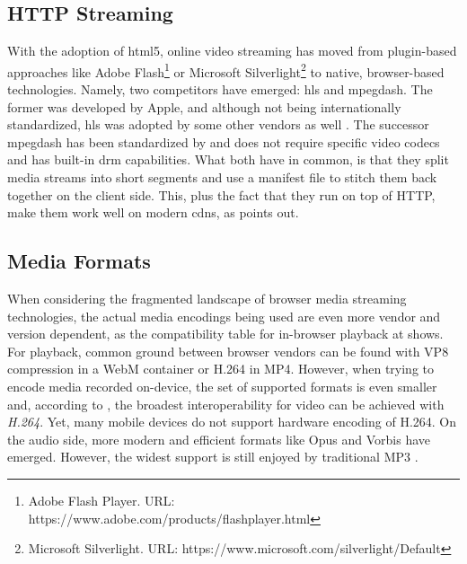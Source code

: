 \subsection{HTTP Streaming}\label{sec:http-streaming}

With the adoption of \gls{html}5, online video streaming has moved from plugin-based approaches like Adobe Flash\footnote{\label{adobe-flash}Adobe Flash Player. URL: {https://www.adobe.com/products/flashplayer.html}} or Microsoft Silverlight\footnote{\label{silverlight}Microsoft Silverlight. URL: {https://www.microsoft.com/silverlight/Default}} to native, browser-based technologies. Namely, two competitors have emerged: \gls{hls} and \gls{mpegdash}. The former was developed by Apple, and although not being internationally standardized, \gls{hls} was adopted by some other vendors as well \cite{caniuse-hls}. The successor \gls{mpegdash} has been standardized by \citet{iso-mpeg-dash} and does not require specific video codecs and has built-in \gls{drm} capabilities. What both have in common, is that they split media streams into short segments and use a manifest file to stitch them back together on the client side. This, plus the fact that they run on top of HTTP, make them work well on modern \glspl{cdn}, as \cite{hls-vs-dash} points out.

\subsection{Media Formats}\label{sec:media-formats}

When considering the fragmented landscape of browser media streaming technologies, the actual media encodings being used are even more vendor and version dependent, as the compatibility table for in-browser playback at \cite{media-format-browser-compat} shows. For playback, common ground between browser vendors can be found with VP8 compression in a WebM container or H.264 in MP4. However, when trying to encode media recorded on-device, the set of supported formats is even smaller and, according to \citet[\S5.1]{webrtc-hacks-safari}, the broadest interoperability for video can be achieved with \textit{H.264}. Yet, many mobile devices do not support hardware encoding of H.264. On the audio side, more modern and efficient formats like Opus and Vorbis have emerged. However, the widest support is still enjoyed by traditional MP3 \cite{media-format-browser-compat}.
